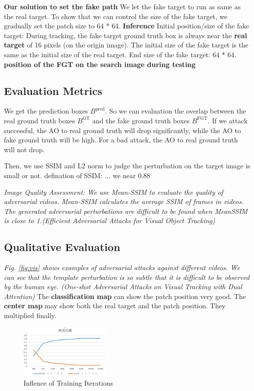 \documentclass{article}
\begin{document}
\textbf{Our solution to set the fake path} We let the fake target to run as same as the real target. To show that we can control the size of the fake target, we gradually set the patch size to 64 * 64.
\textbf{Inference} 
Initial position/size of the fake target: During tracking, the fake target ground truth box is always near the \textbf{real target} of 16 pixels (on the origin image).
The initial size of the fake target is the same as the initial size of the real target.
End size of the fake target: 64 * 64.
\textbf {position of the FGT on the search image during testing}

\subsection{Evaluation Metrics}

We get the prediction boxes $B^{\text{pred}}$. So we can evaluation the overlap between the real ground truth boxes $B^{\text{GT}}$ and the fake ground truth boxes $B^{\text{FGT}}$. If we attack successful, the AO to real ground truth will drop significantly, while the AO to fake ground truth will be high. For a bad attack, the AO to real ground truth will not drop. 

Then, we use SSIM and L2 norm to judge the perturbation on the target image is small or not. 
defination of SSIM: ... we near 0.88

\textit{Image Quality Assessment: We use Mean-SSIM to evaluate the quality of adversarial videos. Mean-SSIM calculates the average SSIM of frames in videos. The generated adversarial perturbations are difficult to be found when MeanSSIM is close to 1.(Efficient Adversarial Attacks for Visual Object Tracking)}

\subsection{Qualitative Evaluation}

\textit{Fig. \ref{fig:vis} shows examples of adversarial attacks against different videos. We can see that the template perturbation is so subtle that it is difficult to be observed by the human eye. (One-shot Adversarial Attacks on Visual Tracking with Dual Attention)} The \textbf{classification map} can show the patch position very good. The \textbf{center map} may show both the real target and the patch position. They multiplied finally.

\begin{figure}[ht]
\centering
\includegraphics[width=0.4\textwidth]{images/iter.jpg}
\caption{Inflence of Training Iterations}
\end{figure}
\end{document}
